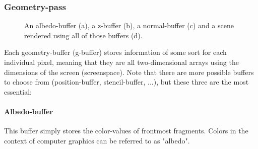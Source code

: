 \documentclass{ACGSeminar}
\begin{document}
	\subsubsection{Geometry-pass}
		\begin{figure}[]
			\caption{An albedo-buffer (a), a z-buffer (b), a normal-buffer (c) and a scene rendered using all of those buffers (d).}
			\label{fig:deferred_shading}%
		\end{figure}

		Each geometry-buffer (g-buffer) stores information of some sort for each individual pixel, meaning that they are all two-dimensional arrays using the dimensions of the screen (screenspace). Note that there are more possible buffers to choose from (position-buffer, stencil-buffer, ...), but these three are the most essential:
		\paragraph{Albedo-buffer}%
			This buffer simply stores the color-values of frontmost fragments. Colors in the context of computer graphics can be referred to as "albedo".%
\end{document}
